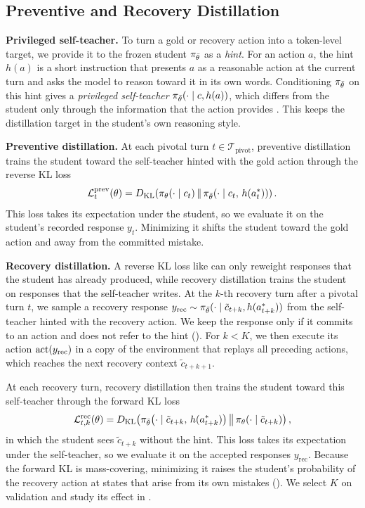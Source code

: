 \documentclass[10pt, logo, onecolumn, copyright]{nv}
\begin{document}
\subsection{Preventive and Recovery Distillation}
\label{sec:recovery}

\textbf{Privileged self-teacher.}
To turn a gold or recovery action into a token-level target, we provide it to the frozen student $\pi_{\bar\theta}$ as a \emph{hint}. For an action $a$, the hint $h(a)$ is a short instruction that presents $a$ as a reasonable action at the current turn and asks the model to reason toward it in its own words. Conditioning $\pi_{\bar\theta}$ on this hint gives a \emph{privileged self-teacher} $\pi_{\bar\theta}(\cdot \mid c, h(a))$, which differs from the student only through the information that the action provides \citep{zhao2026opsd, penaloza2026pid}. This keeps the distillation target in the student's own reasoning style.

\textbf{Preventive distillation.}
At each pivotal turn $t \in \mathcal{T}_\text{pivot}$, preventive distillation trains the student toward the self-teacher hinted with the gold action through the reverse KL loss
\begin{equation}
\mathcal{L}^{\mathrm{prev}}_{t}(\theta) = D_{\mathrm{KL}}\!\left( \pi_\theta\!\left(\cdot \mid c_t\right) \,\middle\|\, \pi_{\bar\theta}\!\left(\cdot \mid c_t,\, h(a^{*}_t)\right) \right).
\label{eq:hint}
\end{equation}
This loss takes its expectation under the student, so we evaluate it on the student's recorded response $y_t$. Minimizing it shifts the student toward the gold action and away from the committed mistake.

\textbf{Recovery distillation.}
A reverse KL loss like  can only reweight responses that the student has already produced, while recovery distillation trains the student on responses that the self-teacher writes. At the $k$-th recovery turn after a pivotal turn $t$, we sample a recovery response $y_\text{rec} \sim \pi_{\bar\theta}(\cdot \mid \tilde{c}_{t+k}, h(a^{*}_{t+k}))$ from the self-teacher hinted with the recovery action. We keep the response only if it commits to an action and does not refer to the hint (). For $k < K$, we then execute its action $\operatorname{act}(y_\text{rec})$ in a copy of the environment that replays all preceding actions, which reaches the next recovery context $\tilde{c}_{t+k+1}$.

At each recovery turn, recovery distillation then trains the student toward this self-teacher through the forward KL loss
\begin{equation}
\mathcal{L}^{\mathrm{rec}}_{t,k}(\theta) = D_{\mathrm{KL}}\!\left( \pi_{\bar\theta}\!\left(\cdot \mid \tilde{c}_{t+k},\, h(a^{*}_{t+k})\right) \,\middle\|\, \pi_\theta\!\left(\cdot \mid \tilde{c}_{t+k}\right) \right),
\label{eq:recovery}
\end{equation}
in which the student sees $\tilde{c}_{t+k}$ without the hint. This loss takes its expectation under the self-teacher, so we evaluate it on the accepted responses $y_\text{rec}$. Because the forward KL is mass-covering, minimizing it raises the student's probability of the recovery action at states that arise from its own mistakes (). We select $K$ on validation and study its effect in .
\end{document}
